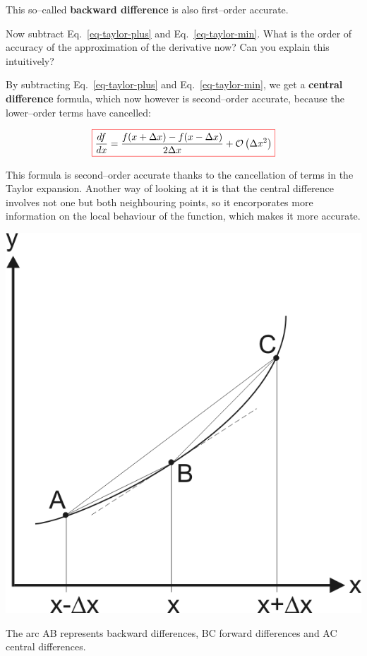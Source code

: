 This so--called \textbf{backward difference} is also first--order accurate.

\begin{cue}
Now subtract Eq.~\ref{eq-taylor-plus} and Eq.~\ref{eq-taylor-min}. What is the order of accuracy of the approximation of the derivative now? Can you explain this intuitively?
\end{cue}

By subtracting Eq.~\ref{eq-taylor-plus} and Eq.~\ref{eq-taylor-min}, we get a \textbf{central difference} formula, which now however is second--order accurate, because the lower--order terms have cancelled:

\begin{equation}
\fbox{$\displaystyle
\frac{d f}{d x} = \frac{f(x + \Delta x) - f(x- \Delta x)}{2 \Delta x} + \mathcal{O}\left(\Delta x^2\right)
$}
\end{equation} 

This formula is second--order accurate thanks to the cancellation of terms in the Taylor expansion. Another way of looking at it is that the central difference involves not one but both neighbouring points, so it encorporates more information on the local behaviour of the function, which makes it more accurate.

\begin{marginfigure}
\centering
\includegraphics{numeric/figures/fd}
\caption{The arc AB represents backward differences, BC forward differences and AC central differences.}
\label{fig-fd}
\end{marginfigure}

